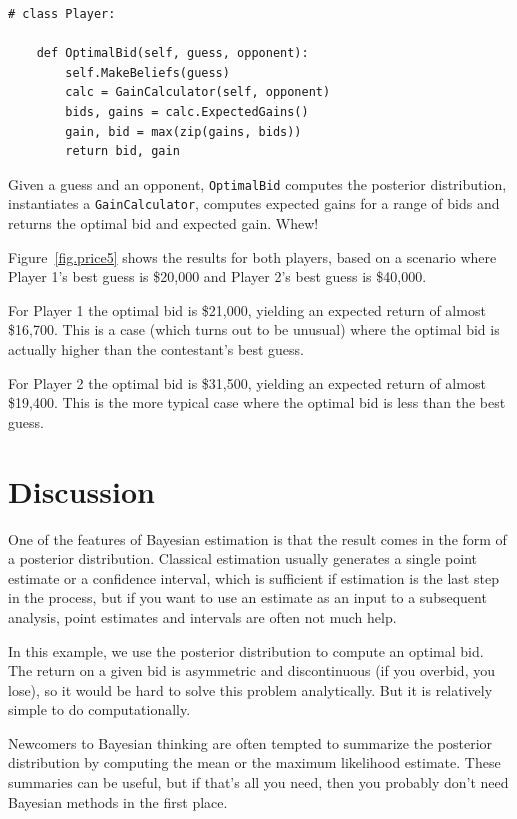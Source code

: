 \documentclass[12pt]{book}
\begin{document}
\begin{verbatim}
# class Player:

    def OptimalBid(self, guess, opponent):
        self.MakeBeliefs(guess)
        calc = GainCalculator(self, opponent)
        bids, gains = calc.ExpectedGains()
        gain, bid = max(zip(gains, bids))
        return bid, gain
\end{verbatim}

Given a guess and an opponent, {\tt OptimalBid} computes
the posterior distribution, instantiates a {\tt GainCalculator},
computes expected gains for a range of bids and returns
the optimal bid and expected gain.  Whew!

Figure~\ref{fig.price5} shows the results for both players,
based on a scenario where Player 1's best guess is \$20,000
and Player 2's best guess is \$40,000.

For Player 1 the optimal bid is \$21,000, yielding an expected
return of almost \$16,700.  This is a case (which turns out
to be unusual) where the optimal bid is actually higher than
the contestant's best guess.

For Player 2 the optimal bid is \$31,500, yielding an expected
return of almost \$19,400.  This is the more typical case where
the optimal bid is less than the best guess.


\section{Discussion}

One of the features of Bayesian estimation is that the
result comes in the form of a posterior distribution.  Classical
estimation usually generates a single point estimate or a confidence
interval, which is sufficient if estimation is the last step in the
process, but if you want to use an estimate as an input to a
subsequent analysis, point estimates and intervals are often not much
help.

In this example, we use the posterior distribution
to compute an optimal bid.  The return on a given bid is asymmetric
and discontinuous (if you overbid, you lose), so it would be hard to
solve this problem analytically.  But it is relatively simple to do
computationally.

Newcomers to Bayesian thinking are often tempted to summarize the
posterior distribution by computing the mean or the maximum
likelihood estimate.  These summaries can be useful, but if that's
all you need, then you probably don't need Bayesian methods in the
first place.
\end{document}
